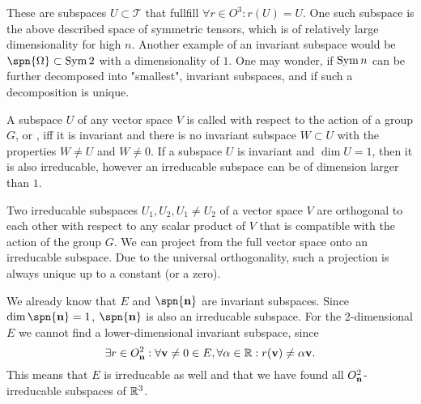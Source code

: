 \begin{example}
	These are subspaces $U\subset\mathcal{T}$ that fullfill $\forall r\in O^3: r(U)=U$. One such subspace is the above described space of symmetric tensors, which is of relatively large dimensionality for high $n$. Another example of an invariant subspace would be $\spn{\Omega}\subset\Sym{2}$ with a dimensionality of $1$.
	One may wonder, if $\operatorname{Sym}{n}$ can be further decomposed into "smallest", invariant subspaces, and if such a decomposition is unique.
\end{example}
\begin{definition} 
	A subspace $U$ of any vector space $V$ is called  with respect to the action of a group $G$, or , iff it is invariant and there is no invariant subspace $W\subset U$ with the properties $W\neq U$ and $W\neq 0$. If a subspace $U$ is invariant and $\dim U=1$, then it is also irreducable, however an irreducable subspace can be of dimension larger than $1$.
	
	Two irreducable subspaces $U_1, U_2, U_1 \neq U_2$ of a vector space $V$ are orthogonal to each other with respect to any scalar product of $V$ that is compatible with the action of the group $G$. We can project from the full vector space onto an irreducable subspace. Due to the universal orthogonality, such a projection is always unique up to a constant (or a zero).
	
\end{definition}
\begin{example}
	We already know that $E$ and $\spn{\vc{n}}$ are invariant subspaces. Since $\dim{\spn{\vc{n}}}=1$, $\spn{\vc{n}}$ is also an irreducable subspace.
	For the 2-dimensional $E$ we cannot find a lower-dimensional invariant subspace, since \[\exists r\in O^2_{\mathbf{n}}: \forall \mathbf{v}\neq 0 \in E, \forall \alpha\in\mathbb{R}: r(\mathbf{v})\neq \alpha \mathbf{v}.\] This means that $E$ is irreducable as well and that we have found all $O^2_{\mathbf{n}}$-irreducable subspaces of $\mathbb{R}^3$.
\end{example}
